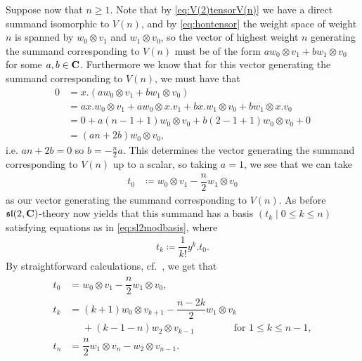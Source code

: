Suppose now that $n\geq 1$. Note that by \cref{eq:V(2)tensorV(n)} we have a direct summand isomorphic to $V(n)$, and by \cref{eq:hontensor} the weight space of weight $n$ is spanned by $w_0\otimes v_1$ and $w_1\otimes v_0$, so the vector of highest weight $n$ generating the summand corresponding to $V(n)$ must be of the form $aw_0\otimes v_1 + bw_1\otimes v_0$ for some $a,b\in \mathbf{C}$. Furthermore we know that for this vector generating the summand corresponding to $V(n)$, we must have that
\begin{align*}
  0 &= x.(aw_0\otimes v_1 + bw_1\otimes v_0) \\
    &= ax.w_0 \otimes v_1 + aw_0\otimes x.v_1 + bx.w_1\otimes v_0 + bw_1\otimes x.v_0 \\
    &= 0 + a(n-1+1)w_0\otimes v_0 + b(2-1+1)w_0\otimes v_0 + 0 \\
  &= (an+2b)w_0\otimes v_0, 
\end{align*}
i.e. $an+2b=0$ so $b = -\tfrac{n}{2}a$. This determines the vector generating the summand corresponding to $V(n)$ up to a scalar, so taking $a=1$, we see that we can take
\begin{align*}
  t_0 &\coloneqq w_0\otimes v_1 - \dfrac{n}{2}w_1\otimes v_0
\end{align*}
as our vector generating the summand corresponding to $V(n)$. As before $\mathfrak{sl}(2,\mathbf{C})$-theory now yields that this summand has a basis $(t_k \mid 0\leq k\leq n)$ satisfying equations as in \cref{eq:sl2modbasis}, where
\begin{align}\label{eq:t_kbasisdef}
  t_k \coloneqq \dfrac{1}{k!}y^k.t_0.
\end{align}
By straightforward calculations, cf.\ , we get that
\begin{align}\label{eq:t_kbasisres}
  \begin{aligned}
    t_0 &= w_0\otimes v_1 - \dfrac{n}{2}w_1\otimes v_0, \\
    t_k &= (k+1)w_0\otimes v_{k+1} - \dfrac{n-2k}{2}w_1\otimes v_k \\
    &\phantom{{}={}}+ (k-1-n)w_2\otimes v_{k-1} \qquad\qquad\mbox{for }1\leq k\leq n-1,\\
    t_n &= \dfrac{n}{2}w_1\otimes v_n - w_2\otimes v_{n-1}.
  \end{aligned}
\end{align}


